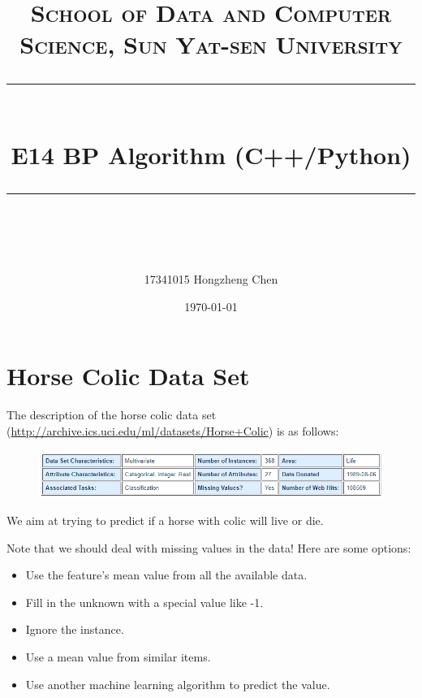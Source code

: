 \documentclass[a4paper, 11pt]{article}
\title{
\normalfont \normalsize
\textsc{School of Data and Computer Science, Sun Yat-sen University} \\ [25pt] %
\rule{\textwidth}{0.5pt} \\[0.4cm] %
\huge  E14 BP Algorithm (C++/Python)\\ %
\rule{\textwidth}{2pt} \\[0.5cm] %
\author{17341015 Hongzheng Chen}
\date{\normalsize\today}
}
\begin{document}
\maketitle
\tableofcontents
\newpage
\section{Horse Colic Data Set}
The description of the horse colic data set (\url{http://archive.ics.uci.edu/ml/datasets/Horse+Colic}) is as follows:
\begin{figure}[ht]
\centering
\includegraphics[width=15cm]{horse}
\end{figure}

We aim at trying to predict if a horse with colic will live or die.

Note that we should deal with missing values in the data! Here are some options:
\begin{itemize}
	\item Use the feature’s mean value from all the available data.
	\item Fill in the unknown with a special value like -1.
	\item Ignore the instance.
	\item Use a mean value from similar items.
	\item Use another machine learning algorithm to predict the value.
\end{itemize}
\end{document}
